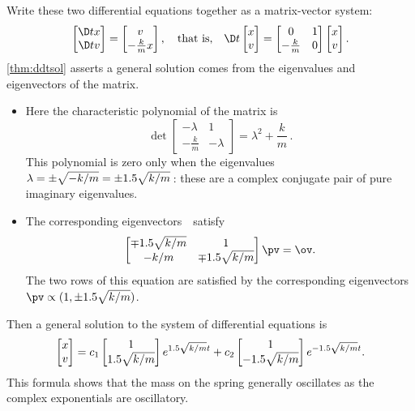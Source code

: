 \begin{OmitV1}
\begin{example}
\begin{solution}
Write these two differential equations together as a matrix-vector system: 
\begin{equation*}
\begin{bmatrix} \D tx\\\D tv \end{bmatrix}
=\begin{bmatrix} v\\-\frac kmx \end{bmatrix},
\quad\text{that is,}\quad
\D t{}\begin{bmatrix} x\\v \end{bmatrix}
=\begin{bmatrix} 0&1\\-\frac km&0 \end{bmatrix}\begin{bmatrix} x\\v \end{bmatrix}.
\end{equation*}
\cref{thm:ddtsol} asserts a general solution comes from the eigenvalues and eigenvectors of the matrix.
\begin{itemize}
\item Here the characteristic polynomial of the matrix is
\begin{equation*}
\det\begin{bmatrix} -\lambda&1\\-\frac km&-\lambda \end{bmatrix}
=\lambda^2+\frac km\,.
\end{equation*}
This polynomial is zero only when the eigenvalues \(\lambda=\pm\sqrt{-k/m}=\pm 1.5\sqrt{k/m}\)\,: these are a complex conjugate pair of pure imaginary eigenvalues.

\item  The corresponding eigenvectors~\pv\ satisfy
\begin{equation*}
\begin{bmatrix} \mp \i\sqrt{k/m}&1\\- k/m&\mp \i\sqrt{k/m} \end{bmatrix}
\pv=\ov.
\end{equation*}
The two rows of this equation are satisfied by the corresponding eigenvectors \(\pv\propto (1,\pm \i\sqrt{k/m})\).
\end{itemize}
Then a general solution to the system of differential equations is
\begin{equation*}
\begin{bmatrix} x\\v \end{bmatrix}
=c_1\begin{bmatrix} 1\\1.5\sqrt{k/m} \end{bmatrix}e^{1.5\sqrt{k/m}t}
+c_2\begin{bmatrix} 1\\-1.5\sqrt{k/m} \end{bmatrix}e^{-1.5\sqrt{k/m}t}.
\end{equation*}
This formula shows that the mass on the spring generally oscillates as the complex exponentials are oscillatory.


\end{solution}
\end{example}
\end{OmitV1}
